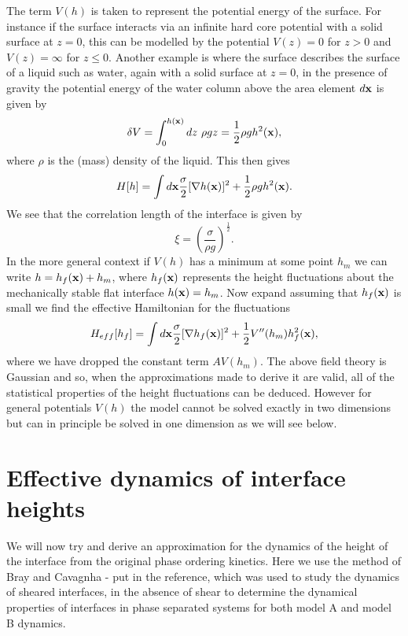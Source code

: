 The term $V(h)$ is taken to represent the potential energy of the surface. For instance if the surface interacts via an infinite hard core potential with a solid surface at $z=0$, this can be modelled by the potential $V(z) =0$ for $z>0$ and $V(z)=\infty$ for $z\leq 0$. Another example is where the surface describes the surface of a liquid such as water, again with a solid surface at $z=0$, in the presence of gravity the potential energy of the water column above the area 
element $d{\bf x}$ is given by
\begin{equation}
    \delta V = \int_0^{h({\bf x})} dz\ \rho g z = \frac{1}{2}\rho g h^2({\bf x}),
\end{equation}
where $\rho$ is the (mass) density of the liquid. This then gives
\begin{equation}
    H[h] = \int d{\bf x} \frac{\sigma}{2}[\nabla h({\bf x})]^2 + \frac{1}{2}\rho g h^2({\bf x}).
\end{equation}
We see that the correlation length of the interface is given by
\begin{equation}
    \xi = \left(\frac{\sigma}{\rho g}\right)^{\frac{1}{2}}.
\end{equation}
In the more general context if $V(h)$ has a minimum at some point $h_m$ we can write $h= h_f({\bf x})+ h_m$, where  $h_f({\bf x})$ represents the height fluctuations about the mechanically stable flat interface $h({\bf x})=h_m$. Now expand assuming that $h_f({\bf x})$ is
small we find the effective Hamiltonian for the fluctuations
\begin{equation}
    H_{eff}[h_f] = \int d{\bf x} \frac{\sigma}{2}[\nabla h_f({\bf x})]^2 + \frac{1}{2}V''(h_m) h_f^2({\bf x}),
\end{equation}
where we have dropped the constant term $AV(h_m)$. The above field theory is Gaussian and 
so, when the approximations made to derive it are valid, all of the statistical properties of the height fluctuations can be deduced. However for general potentials $V(h)$ the model cannot be solved exactly in two dimensions but can in principle be solved in one dimension as we will see below.


    \section{Effective dynamics of interface heights}\label{heightd}
We will now try and derive an approximation for the dynamics of the  height of the interface from the original phase ordering kinetics. Here we use the method of Bray and Cavagnha - put in the reference, which was used to study the dynamics of sheared interfaces, in the absence of shear to determine the dynamical properties of interfaces in phase separated systems for both model A and model B dynamics.

